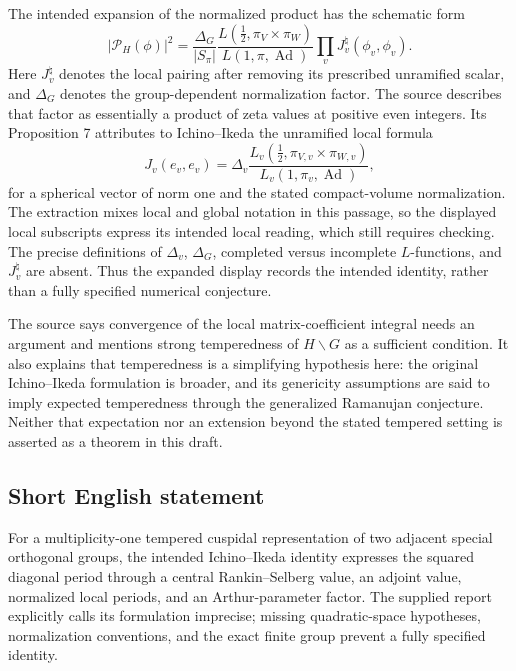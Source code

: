 \documentclass[11pt]{article}
\begin{document}
The intended expansion of the normalized product has the schematic form
\[
\left|\mathcal P_H(\phi)\right|^2
=\frac{\Delta_G}{|S_\pi|}
\frac{L(\tfrac12,\pi_V\times\pi_W)}{L(1,\pi,\operatorname{Ad})}
\prod_v J_v^{\natural}(\phi_v,\phi_v).
\]
Here \(J_v^{\natural}\) denotes the local pairing after removing its prescribed unramified scalar, and \(\Delta_G\) denotes the group-dependent normalization factor. The source describes that factor as essentially a product of zeta values at positive even integers. Its Proposition 7 attributes to Ichino--Ikeda the unramified local formula
\[
J_v(e_v,e_v)=\Delta_v
\frac{L_v(\tfrac12,\pi_{V,v}\times\pi_{W,v})}{L_v(1,\pi_v,\operatorname{Ad})},
\]
for a spherical vector of norm one and the stated compact-volume normalization. The extraction mixes local and global notation in this passage, so the displayed local subscripts express its intended local reading, which still requires checking. The precise definitions of \(\Delta_v\), \(\Delta_G\), completed versus incomplete \(L\)-functions, and \(J_v^{\natural}\) are absent. Thus the expanded display records the intended identity, rather than a fully specified numerical conjecture.

The source says convergence of the local matrix-coefficient integral needs an argument and mentions strong temperedness of \(H\backslash G\) as a sufficient condition. It also explains that temperedness is a simplifying hypothesis here: the original Ichino--Ikeda formulation is broader, and its genericity assumptions are said to imply expected temperedness through the generalized Ramanujan conjecture. Neither that expectation nor an extension beyond the stated tempered setting is asserted as a theorem in this draft.
\subsection{Short English statement}
For a multiplicity-one tempered cuspidal representation of two adjacent special orthogonal groups, the intended Ichino--Ikeda identity expresses the squared diagonal period through a central Rankin--Selberg value, an adjoint value, normalized local periods, and an Arthur-parameter factor. The supplied report explicitly calls its formulation imprecise; missing quadratic-space hypotheses, normalization conventions, and the exact finite group prevent a fully specified identity.
\end{document}
